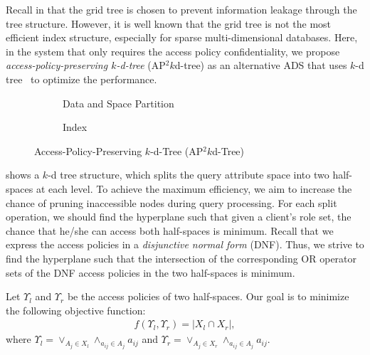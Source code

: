 Recall in  that the grid tree is chosen to prevent information leakage through the tree structure. However, it is well known that the grid tree is not the most efficient index structure, especially for sparse multi-dimensional databases. Here, in the system that only requires the access policy confidentiality, we propose \emph{access-policy-preserving $k$-d-tree} (AP$^2k$d-tree) as an alternative ADS that uses $k$-d tree~\cite{10.1145/361002.361007} to optimize the performance.

\begin{figure}[t]
    \centering
    \begin{subfigure}[b]{\linewidth}
        \centering
        \resizebox{.7\linewidth}{!}{}
        \caption{Data and Space Partition}\label{fig:access-control:access-kd-tree-struct}
    \end{subfigure}
    \begin{subfigure}[b]{\linewidth}
        \centering
        \resizebox{.7\linewidth}{!}{}
        \caption{Index}\label{fig:access-control:access-kd-tree-index}
    \end{subfigure}
    \caption{Access-Policy-Preserving $k$-d-Tree (AP$^2k$d-Tree)}\label{fig:access-control:access-kd-tree}
\end{figure}

 shows a $k$-d tree structure, which splits the query attribute space into two half-spaces at each level.
To achieve the maximum efficiency, we aim to increase the chance of pruning inaccessible nodes during query processing. For each split operation, we should find the hyperplane such that given a client's role set, the chance that he/she can access both half-spaces is minimum.
Recall that we express the access policies in a \emph{disjunctive normal form} (DNF).
Thus, we strive to find the hyperplane such that the intersection of the corresponding OR operator sets of the DNF access policies in the two half-spaces is minimum.

Let $\Upsilon_l$ and $\Upsilon_r$ be the access policies of two half-spaces. Our goal is to minimize the following objective function:
\begin{align*}
    f(\Upsilon_l, \Upsilon_r) = |X_l \cap X_r|,
\end{align*}
where $\Upsilon_l = \lor_{A_j \in X_l}\land_{a_{ij} \in A_j} a_{ij}$ and $\Upsilon_r = \lor_{A_j \in X_r}\land_{a_{ij} \in A_j} a_{ij}$.

